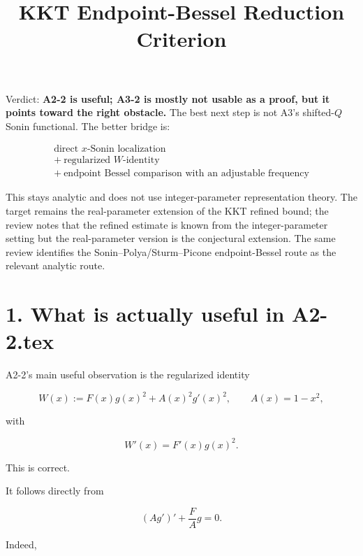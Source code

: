 \documentclass[11pt]{article}
\title{KKT Endpoint-Bessel Reduction Criterion}
\author{}
\date{}
\begin{document}
\maketitle

Verdict: \textbf{A2-2 is useful; A3-2 is mostly not usable as a proof, but it points toward the right obstacle.} The best next step is not A3's shifted-\(Q\) Sonin functional. The better bridge is:

\begin{equation*}
\boxed{
\begin{gathered}
\text{direct }x\text{-Sonin localization}\\
+\ \text{regularized }W\text{-identity}\\
+\ \text{endpoint Bessel comparison with an adjustable frequency}
\end{gathered}
}
\end{equation*}


This stays analytic and does not use integer-parameter representation theory. The target remains the real-parameter extension of the KKT refined bound; the review notes that the refined estimate is known from the integer-parameter setting but the real-parameter version is the conjectural extension.  The same review identifies the Sonin--Polya/Sturm--Picone endpoint-Bessel route as the relevant analytic route.



\section*{1. What is actually useful in A2-2.tex}

A2-2's main useful observation is the regularized identity

\begin{equation*}
W(x):=F(x)g(x)^2+A(x)^2g'(x)^2,
\qquad A(x)=1-x^2,
\end{equation*}


with

\begin{equation*}
\boxed{
W'(x)=F'(x)g(x)^2.
}
\tag{1}
\end{equation*}


This is correct.

It follows directly from

\begin{equation*}
(A g')'+\frac{F}{A}g=0.
\end{equation*}


Indeed,
\end{document}
